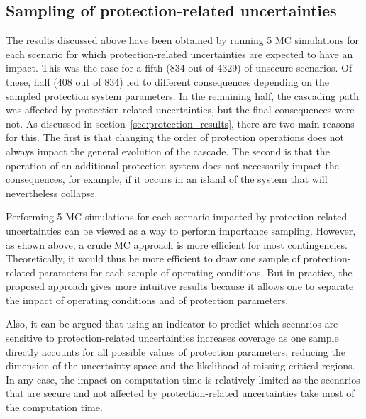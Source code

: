 \subsection{Sampling of protection-related uncertainties}
\label{sec:PDSA_results_protections}

The results discussed above have been obtained by running 5 MC simulations for each scenario for which protection-related uncertainties are expected to have an impact. This was the case for a fifth (834 out of 4329) of unsecure scenarios. Of these, half (408 out of 834) led to different consequences depending on the sampled protection system parameters. In the remaining half, the cascading path was affected by protection-related uncertainties, but the final consequences were not. As discussed in section~\ref{sec:protection_results}, there are two main reasons for this. The first is that changing the order of protection operations does not always impact the general evolution of the cascade. The second is that the operation of an additional protection system does not necessarily impact the consequences, for example, if it occurs in an island of the system that will nevertheless collapse.

Performing 5 MC simulations for each scenario impacted by protection-related uncertainties can be viewed as a way to perform importance sampling. However, as shown above, a crude MC approach is more efficient for most contingencies. Theoretically, it would thus be more efficient to draw one sample of protection-related parameters for each sample of operating conditions. But in practice, the proposed approach gives more intuitive results because it allows one to separate the impact of operating conditions and of protection parameters.

Also, it can be argued that using an indicator to predict which scenarios are sensitive to protection-related uncertainties increases coverage as one sample directly accounts for all possible values of protection parameters, reducing the dimension of the uncertainty space and the likelihood of missing critical regions. In any case, the impact on computation time is relatively limited as the scenarios that are secure and not affected by protection-related uncertainties take most of the computation time.


